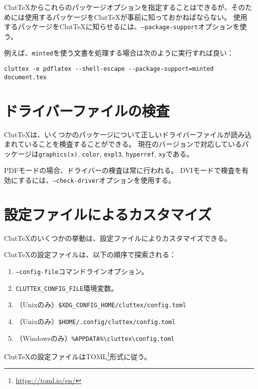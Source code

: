 \documentclass[a4paper]{ltjsreport}
\newcommand\ClutTeX{Clut\TeX}
\newcommand\texpkg[1]{\texttt{#1}}
\begin{document}
\ClutTeX{}からこれらのパッケージオプションを指定することはできるが、そのためには使用するパッケージを\ClutTeX{}が事前に知っておかねばならない。
使用するパッケージを\ClutTeX{}に知らせるには、\texttt{--package-support}オプションを使う。

例えば、\texpkg{minted}を使う文書を処理する場合は次のように実行すれば良い：
\begin{verbatim}
cluttex -e pdflatex --shell-escape --package-support=minted document.tex
\end{verbatim}

\section{ドライバーファイルの検査}

\ClutTeX{}は、いくつかのパッケージについて正しいドライバーファイルが読み込まれていることを検査することができる。
現在のバージョンで対応しているパッケージは\texpkg{graphics(x)}, \texpkg{color}, \texpkg{expl3}, \texpkg{hyperref}, \texpkg{xy}である。

PDFモードの場合、ドライバーの検査は常に行われる。
DVIモードで検査を有効にするには、\texttt{--check-driver}オプションを使用する。

\section{設定ファイルによるカスタマイズ}\label{sec:config-file}

\ClutTeX{}のいくつかの挙動は、設定ファイルによりカスタマイズできる。

\ClutTeX{}の設定ファイルは、以下の順序で探索される：
\begin{enumerate}
\item \texttt{--config-file}コマンドラインオプション。
\item \texttt{CLUTTEX\_CONFIG\_FILE}環境変数。
\item （Unixのみ）\texttt{\$XDG\_CONFIG\_HOME/cluttex/config.toml}
\item （Unixのみ）\texttt{\$HOME/.config/cluttex/config.toml}
\item （Windowsのみ）\texttt{\%APPDATA\%\textbackslash cluttex\textbackslash config.toml}
\end{enumerate}

\ClutTeX{}の設定ファイルはTOML\footnote{\url{https://toml.io/en/}}形式に従う。
\end{document}
